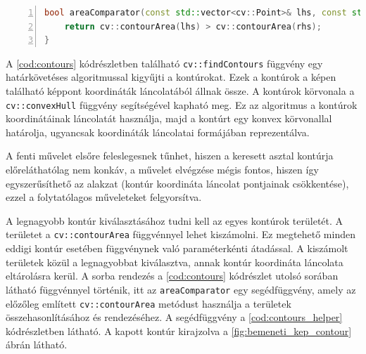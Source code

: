 \vspace{5mm}
\hspace{-10mm}
\begin{minipage}{\linewidth}
\begin{lstlisting}[language=C++, numbers=left, caption={Sorba rendezéshez használt segédfüggvény.}, label={cod:contours_helper}]
bool areaComparator(const std::vector<cv::Point>& lhs, const std::vector<cv::Point>& rhs) {
    return cv::contourArea(lhs) > cv::contourArea(rhs);
}
\end{lstlisting}
\end{minipage}

\par A \ref{cod:contours} kódrészletben található \lstinline{cv::findContours} függvény \cite{opencv_docs, SUZUKI198532} egy határkövetéses algoritmussal kigyűjti a kontúrokat. Ezek a kontúrok a képen található képpont koordináták láncolatából állnak össze. A kontúrok körvonala a \lstinline{cv::convexHull} függvény \cite{opencv_docs, SKLANSKY198279} segítségével kapható meg. Ez az algoritmus a kontúrok koordinátáinak láncolatát használja, majd a kontúrt egy konvex körvonallal határolja, ugyancsak koordináták láncolatai formájában reprezentálva.
\par A fenti művelet elsőre feleslegesnek tűnhet, hiszen a keresett asztal kontúrja előreláthatólag nem konkáv, a művelet elvégzése mégis fontos, hiszen így egyszerűsíthető az alakzat (kontúr koordináta láncolat pontjainak csökkentése), ezzel a folytatólagos műveleteket felgyorsítva.
\par A legnagyobb kontúr kiválasztásához tudni kell az egyes kontúrok területét. A területet a \lstinline{cv::contourArea} függvénnyel \cite{opencv_docs} lehet kiszámolni. Ez megtehető minden eddigi kontúr esetében függvénynek való paraméterkénti átadással. A kiszámolt területek közül a legnagyobbat kiválasztva, annak kontúr koordináta láncolata eltárolásra kerül. A sorba rendezés a \ref{cod:contours} kódrészlet utolsó sorában látható függvénnyel történik, itt az \lstinline{areaComparator} egy segédfüggvény, amely az előzőleg említett \lstinline{cv::contourArea} metódust\cite{opencv_docs} használja a területek összehasonlításához és rendezéséhez. A segédfüggvény a \ref{cod:contours_helper} kódrészletben látható. A kapott kontúr kirajzolva a \ref{fig:bemeneti_kep_contour} ábrán látható.

